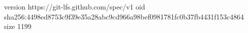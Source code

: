 version https://git-lfs.github.com/spec/v1
oid sha256:4498ed8753c9f39e35a28abc9cd966a98bef0981781fc0b37fb4431f153c4864
size 1199
